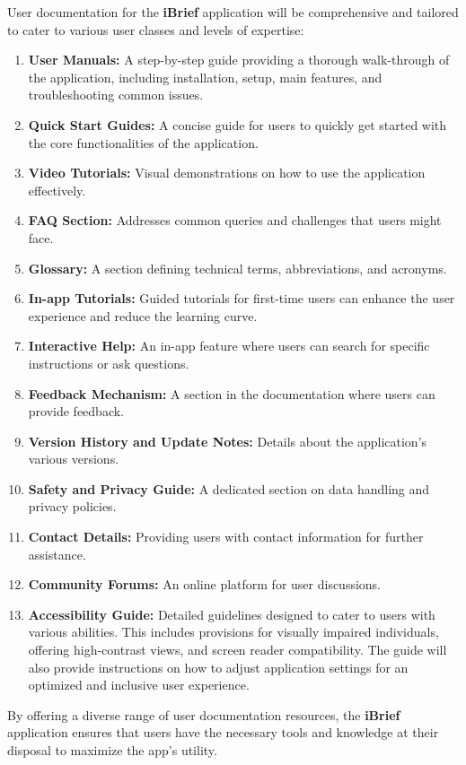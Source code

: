 User documentation for the \textbf{iBrief} application will be comprehensive and tailored to cater to various user classes and levels of expertise:

\begin{enumerate}
    \item \textbf{User Manuals:} A step-by-step guide providing a thorough walk-through of the application, including installation, setup, main features, and troubleshooting common issues.
    
    \item \textbf{Quick Start Guides:} A concise guide for users to quickly get started with the core functionalities of the application.
    
    \item \textbf{Video Tutorials:} Visual demonstrations on how to use the application effectively.
    
    \item \textbf{FAQ Section:} Addresses common queries and challenges that users might face.
    
    \item \textbf{Glossary:} A section defining technical terms, abbreviations, and acronyms.

    \item \textbf{In-app Tutorials:} Guided tutorials for first-time users can enhance the user experience and reduce the learning curve.
    
    \item \textbf{Interactive Help:} An in-app feature where users can search for specific instructions or ask questions.
    
    \item \textbf{Feedback Mechanism:} A section in the documentation where users can provide feedback.
    
    \item \textbf{Version History and Update Notes:} Details about the application's various versions.

    \item \textbf{Safety and Privacy Guide:} A dedicated section on data handling and privacy policies.
    
    \item \textbf{Contact Details:} Providing users with contact information for further assistance.
    
    \item \textbf{Community Forums:} An online platform for user discussions.
    
    \item \textbf{Accessibility Guide:} Detailed guidelines designed to cater to users with various abilities. This includes provisions for visually impaired individuals, offering high-contrast views, and screen reader compatibility. The guide will also provide instructions on how to adjust application settings for an optimized and inclusive user experience.
\end{enumerate}

By offering a diverse range of user documentation resources, the \textbf{iBrief} application ensures that users have the necessary tools and knowledge at their disposal to maximize the app's utility.

